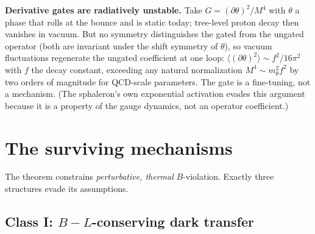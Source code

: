 \documentclass[12pt,a4paper]{article}
\begin{document}
\medskip
\noindent\textbf{Derivative gates are radiatively unstable.}
Take $G=(\partial\theta)^{2}/M^{4}$ with $\theta$ a phase that rolls at
the bounce and is static today; tree-level proton decay then vanishes in
vacuum.  But no symmetry distinguishes the gated from the ungated
operator (both are invariant under the shift symmetry of $\theta$), so
vacuum fluctuations regenerate the ungated coefficient at one loop:
$\langle(\partial\theta)^{2}\rangle\sim f^{2}/16\pi^{2}$ with $f$ the
decay constant, exceeding any natural normalization
$M^{4}\sim m_{\theta}^{2}f^{2}$ by two orders of magnitude for
QCD-scale parameters.  The gate is a fine-tuning, not a mechanism.  (The
sphaleron's own exponential activation evades this argument because it
is a property of the gauge dynamics, not an operator coefficient.)

\section{The surviving mechanisms}
\label{sec:survivors}

The theorem constrains \emph{perturbative, thermal} $B$-violation.
Exactly three structures evade its assumptions.

\subsection{Class I: $B\!-\!L$-conserving dark transfer}
\label{sec:classI}
\end{document}
